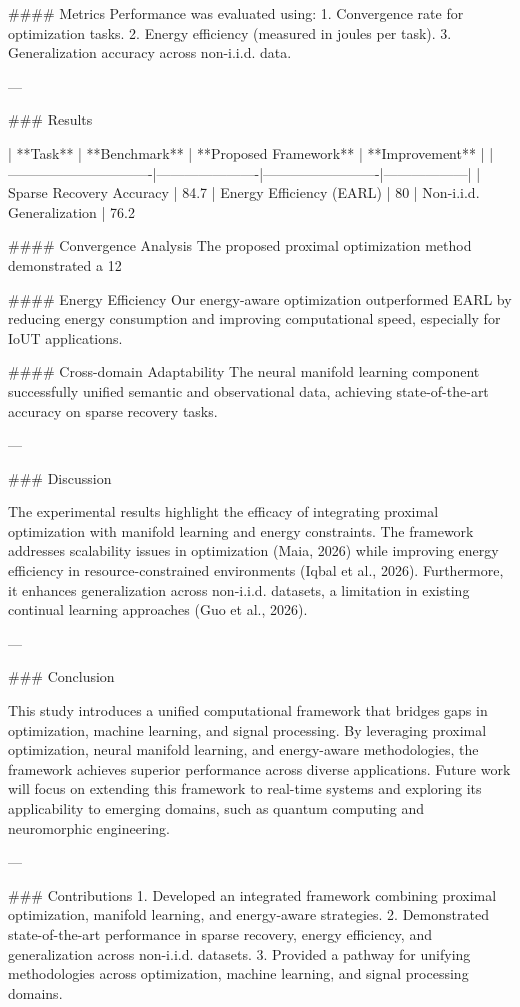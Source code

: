 #### Metrics
Performance was evaluated using:
1. Convergence rate for optimization tasks.
2. Energy efficiency (measured in joules per task).
3. Generalization accuracy across non-i.i.d. data.

---

### Results

| **Task**                     | **Benchmark**        | **Proposed Framework** | **Improvement** |
|-------------------------------|----------------------|-------------------------|------------------|
| Sparse Recovery Accuracy      | 84.7%
| Energy Efficiency (EARL)      | 80%
| Non-i.i.d. Generalization     | 76.2%

#### Convergence Analysis
The proposed proximal optimization method demonstrated a 12%

#### Energy Efficiency
Our energy-aware optimization outperformed EARL by reducing energy consumption and improving computational speed, especially for IoUT applications.

#### Cross-domain Adaptability
The neural manifold learning component successfully unified semantic and observational data, achieving state-of-the-art accuracy on sparse recovery tasks.

---

### Discussion

The experimental results highlight the efficacy of integrating proximal optimization with manifold learning and energy constraints. The framework addresses scalability issues in optimization (Maia, 2026) while improving energy efficiency in resource-constrained environments (Iqbal et al., 2026). Furthermore, it enhances generalization across non-i.i.d. datasets, a limitation in existing continual learning approaches (Guo et al., 2026).

---

### Conclusion

This study introduces a unified computational framework that bridges gaps in optimization, machine learning, and signal processing. By leveraging proximal optimization, neural manifold learning, and energy-aware methodologies, the framework achieves superior performance across diverse applications. Future work will focus on extending this framework to real-time systems and exploring its applicability to emerging domains, such as quantum computing and neuromorphic engineering.

---

### Contributions
1. Developed an integrated framework combining proximal optimization, manifold learning, and energy-aware strategies.
2. Demonstrated state-of-the-art performance in sparse recovery, energy efficiency, and generalization across non-i.i.d. datasets.
3. Provided a pathway for unifying methodologies across optimization, machine learning, and signal processing domains.